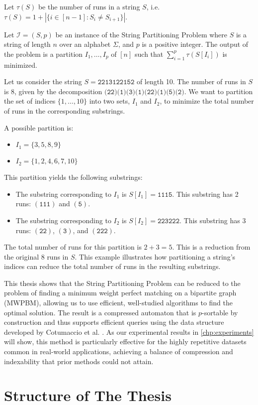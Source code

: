 \begin{definition}
    Let $\tau(S)$ be the number of runs in a string $S$, i.e. $\tau(S) = 1 + |\{i \in [n-1]:S_i \neq S_{i+1}\}|$.
\end{definition}

\begin{definition}
    \label{def:string_partitioning_problem}
    Let $\mathcal{I} = (S, p)$ be an instance of the String Partitioning Problem where $S$ is a string of length $n$ over an alphabet $\Sigma$, and $p$ is a positive integer. The output of the problem is a partition $I_1,\dots,I_p$ of $[n]$ such that $\sum_{i=1}^p \tau(S[I_i])$ is minimized.
\end{definition}

\begin{example}
\label{ex:string-partitioning}
    Let us consider the string $S = \texttt{2213122152}$ of length 10. The number of runs in $S$ is 8, given by the decomposition $\texttt{(22)(1)(3)(1)(22)(1)(5)(2)}$.
    We want to partition the set of indices $\{1, \dots, 10\}$ into two sets, $I_1$ and $I_2$, to minimize the total number of runs in the corresponding substrings.

    A possible partition is:
    \begin{itemize}
        \item $I_1 = \{3, 5, 8, 9\}$
        \item $I_2 = \{1, 2, 4, 6, 7, 10\}$
    \end{itemize}

    This partition yields the following substrings:
    \begin{itemize}
        \item The substring corresponding to $I_1$ is $S[I_1] = \texttt{1115}$. This substring has 2 runs: $(\texttt{111})$ and $(\texttt{5})$.
        \item The substring corresponding to $I_2$ is $S[I_2] = \texttt{223222}$. This substring has 3 runs: $(\texttt{22})$, $(\texttt{3})$, and $(\texttt{222})$.
    \end{itemize}

    The total number of runs for this partition is $2 + 3 = 5$. This is a reduction from the original 8 runs in $S$. This example illustrates how partitioning a string's indices can reduce the total number of runs in the resulting substrings.
\end{example}

This thesis shows that the String Partitioning Problem can be reduced to the problem of finding a minimum weight perfect matching on a bipartite graph (MWPBM), allowing us to use efficient, well-studied algorithms to find the optimal solution. The result is a compressed automaton that is $p$-sortable by construction and thus supports efficient queries using the data structure developed by Cotumaccio et al. \cite{cotumaccio2023co}. As our experimental results in \cref{chp:experiments} will show, this method is particularly effective for the highly repetitive datasets common in real-world applications, achieving a balance of compression and indexability that prior methods could not attain.

\section{Structure of The Thesis}

